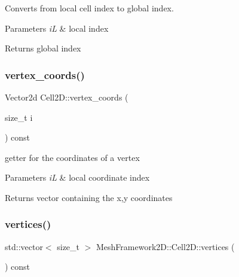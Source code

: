 Converts from local cell index to global index. 


\begin{DoxyParams}{Parameters}
{\em iL} & local index\\
\hline
\end{DoxyParams}
\begin{DoxyReturn}{Returns}
global index 
\end{DoxyReturn}
\mbox{\label{classMeshFramework2D_1_1Cell2D_a80dd9d0a3bffccc32f1c9b89dc0ae0d1}} 
\subsubsection{\texorpdfstring{vertex\+\_\+coords()}{vertex\_coords()}}
{\footnotesize\ttfamily Vector2d Cell2\+D\+::vertex\+\_\+coords (\begin{DoxyParamCaption}\item[{size\+\_\+t}]{i }\end{DoxyParamCaption}) const}



getter for the coordinates of a vertex 


\begin{DoxyParams}{Parameters}
{\em iL} & local coordinate index\\
\hline
\end{DoxyParams}
\begin{DoxyReturn}{Returns}
vector containing the x,y coordinates 
\end{DoxyReturn}
\mbox{\label{classMeshFramework2D_1_1Cell2D_a325799dd2b8542035a9539fc2ec63220}} 
\subsubsection{\texorpdfstring{vertices()}{vertices()}}
{\footnotesize\ttfamily std\+::vector$<$ size\+\_\+t $>$ Mesh\+Framework2\+D\+::\+Cell2\+D\+::vertices (\begin{DoxyParamCaption}{ }\end{DoxyParamCaption}) const\hspace{0.3cm}{\ttfamily [inline]}}



